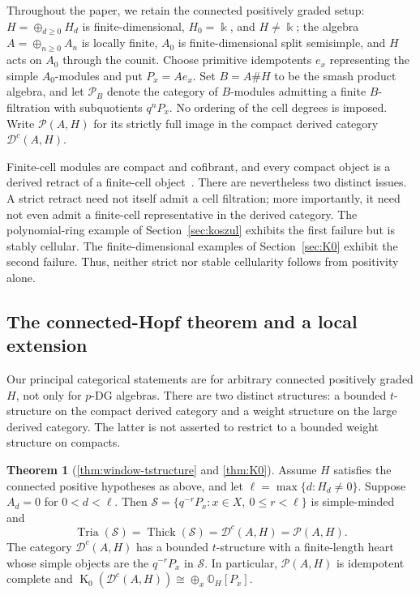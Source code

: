 \documentclass[11pt]{article}
\theoremstyle{definition}
\newtheorem*{thm*}{Theorem}
\numberwithin{equation}{section}
\newcommand{\kk}{\Bbbk}
\newcommand{\Pun}{\mathcal{P}_B}
\newcommand{\Tcat}{\mathcal{P}(A,H)}
\newcommand{\Dc}{\mathcal{D}^c(A,H)}
\newcommand{\tria}{\operatorname{Tria}}
\newcommand{\thick}{\operatorname{Thick}}
\newcommand{\K}{\operatorname{K}_0}
\begin{document}
Throughout the paper, we retain the connected
positively graded setup: $H=\oplus_{d\ge 0 }H_d$ is finite-dimensional, $H_0=\kk$,
and $H\ne\kk$; the algebra $A=\oplus_{n\ge0}A_n$ is locally finite,
$A_0$ is finite-dimensional split semisimple, and $H$ acts on $A_0$ through
the counit. Choose primitive idempotents $e_x$ representing the simple
$A_0$-modules and put $P_x=Ae_x$. Set $B=A \# H$ to be the smash product algebra, and let $\Pun$ denote the category of $B$-modules
admitting a finite $B$-filtration with subquotients $q^nP_x$.
No ordering of the cell degrees is imposed.  Write $\Tcat$ for its strictly
full image in the compact derived category $\Dc$.

Finite-cell modules are compact and cofibrant, and every compact object is
a derived retract of a finite-cell object~\cite[Section~7]{QYHopf}.
There are nevertheless two distinct issues.  A strict retract need not
itself admit a cell filtration; more importantly, it need not even admit a
finite-cell representative in the derived category.  The polynomial-ring
example of Section~\ref{sec:koszul} exhibits the first failure but is
stably cellular.  The finite-dimensional examples of
Section~\ref{sec:K0} exhibit the second failure. Thus, neither strict
nor stable cellularity follows from positivity alone.

\subsection{The connected-Hopf theorem and a local extension}
Our principal categorical statements are for arbitrary connected positively graded
$H$, not only for $p$-DG algebras.  
There are two distinct structures: a bounded $t$-structure on the compact
derived category and a weight structure on the large derived category.
The latter is not asserted to restrict to a bounded weight structure on
compacts.

\begin{thm*}[\ref{thm:window-tstructure} and \ref{thm:K0}]
Assume $H$ satisfies the connected positive hypotheses as above, and let $\ell=\max\{d:H_d\ne0\}$. Suppose
$A_d=0$ for $0<d<\ell$.  Then
$\mathcal{S}=\{q^{-r}P_x:x\in X,\ 0\le r<\ell\}$ is simple-minded and
\[
 \tria(\mathcal S)=\thick(\mathcal S)=\Dc=\Tcat.
\]
The category $\Dc$ has a bounded $t$-structure with a finite-length heart
whose simple objects are the $q^{-r}P_x$ in $\mathcal{S}$.  In particular,
$\Tcat$ is idempotent complete and
$\K(\Dc)\cong\oplus_x\mathbb O_H[P_x]$.
\end{thm*}
\end{document}
